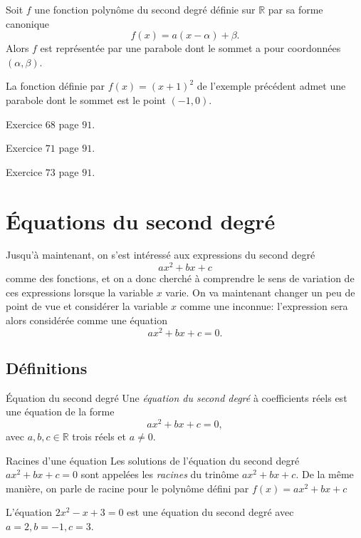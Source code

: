 \documentclass[11pt]{article}
\begin{document}
\begin{prop}
  Soit $f$ une fonction polynôme du second degré définie sur $\mathbb{R}$ par sa
  forme canonique
  \[
    f(x) = a(x-\alpha)+\beta.
  \]
  Alors $f$ est représentée par une parabole dont le sommet a pour coordonnées
  $(\alpha, \beta)$.
\end{prop}
\begin{exemple}
  La fonction définie par $f(x)=(x+1)^2$ de l'exemple précédent admet une
  parabole dont le sommet est le point $(-1, 0)$.
\end{exemple}
\begin{exo}
  Exercice $68$ page $91$.
\end{exo}
\begin{exo}
  Exercice $71$ page $91$.
\end{exo}
\begin{exo}
  Exercice $73$ page $91$.
\end{exo}

\section{Équations du second degré}

Jusqu'à maintenant, on s'est intéressé aux expressions du second degré
\[
  ax^2+bx+c
\]
comme des fonctions, et on a donc cherché à comprendre le sens de variation de
ces expressions lorsque la variable $x$ varie. On va maintenant changer un peu
de point de vue et considérer la variable $x$ comme une inconnue: l'expression
sera alors considérée comme une équation
\[
  ax^2+bx+c = 0.
\]

\subsection{Définitions} 
\begin{defi}{Équation du second degré}
  Une \emph{équation du second degré} à coefficients réels est une équation de
  la forme
  \[
    ax^2+bx+c = 0,
  \]
  avec $a,b,c\in\mathbb{R}$ trois réels et $a\neq0$.
\end{defi}

\begin{defi}{Racines d'une équation}
  Les solutions de l'équation du second degré $ax^2+bx+c=0$ sont appelées les
  \emph{racines} du trinôme $ax^2+bx+c$. De la même manière, on parle de racine
  pour le polynôme défini par $f(x)=ax^2+bx+c$
\end{defi}


\begin{exemple}
  L'équation $2x^2-x+3=0$ est une équation du second degré avec $a=2, b=-1, c=3$.
\end{exemple}
\end{document}
